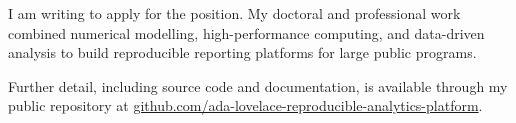 \documentclass{careerdossier-letter}
\begin{document}
\MakeCDossierLetterhead

I am writing to apply for the position. My doctoral and professional work
combined numerical modelling, high-performance computing, and data-driven
analysis to build reproducible reporting platforms for large public programs.

Further detail, including source code and documentation, is available through my
public repository at
\href{https://github.com/ada-lovelace-reproducible-analytics-platform}{github.com/ada-lovelace-reproducible-analytics-platform}.

\MakeCDossierClosing
\end{document}

